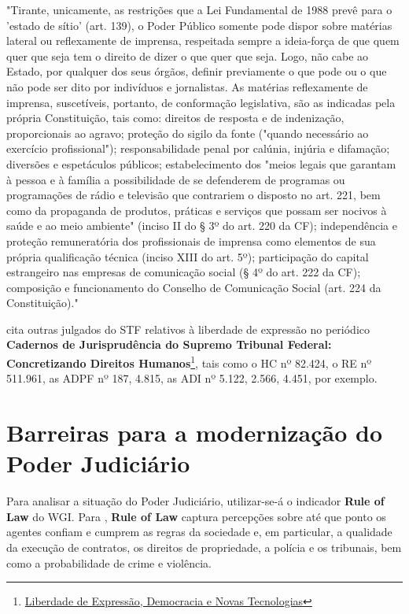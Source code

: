 \noindent
\begin{flushleft}
\setlength{\leftskip}{4cm}
\small
"Tirante, unicamente, as restrições que a Lei Fundamental de 1988 prevê para o 'estado de sítio' (art. 139), o Poder Público somente pode dispor sobre matérias lateral ou reflexamente de imprensa, respeitada sempre a ideia-força de que quem quer que seja tem o direito de dizer o que quer que seja. Logo, não cabe ao Estado, por qualquer dos seus órgãos, definir previamente o que pode ou o que não pode ser dito por indivíduos e jornalistas. As matérias reflexamente de imprensa, suscetíveis, portanto, de conformação legislativa, são as indicadas pela própria Constituição, tais como: direitos de resposta e de indenização, proporcionais ao agravo; proteção do sigilo da fonte ("quando necessário ao exercício profissional"); responsabilidade penal por calúnia, injúria e difamação; diversões e espetáculos
públicos; estabelecimento dos "meios legais que garantam à pessoa e à família a possibilidade de se defenderem de programas ou programações de rádio e televisão que contrariem o disposto no art. 221, bem como da propaganda de produtos, práticas e serviços que possam ser nocivos à saúde e ao meio ambiente" (inciso II do § 3º
do art. 220 da CF); independência e proteção remuneratória dos profissionais de imprensa como elementos de sua própria qualificação técnica (inciso XIII do art. 5º); participação do capital estrangeiro nas empresas de comunicação social (§ 4º do
art. 222 da CF); composição e funcionamento do Conselho de Comunicação Social (art. 224 da Constituição)." \cite{ado26}
\end{flushleft}

\cite{stf_caderno_liberdadeexpressao} cita outras julgados do STF relativos à liberdade de expressão no periódico \textbf{Cadernos de Jurisprudência do Supremo Tribunal Federal: Concretizando Direitos Humanos}\footnote{\href{https://www.cnj.jus.br/wp-content/uploads/2024/12/cadernos-stf-liberdadeexpressaoenovastecnologias.pdf}{Liberdade de Expressão, Democracia e Novas Tecnologias}}, tais como o HC nº 82.424, o RE nº 511.961, as ADPF nº 187, 4.815, as ADI nº 5.122, 2.566, 4.451, por exemplo.

\section{Barreiras para a modernização do Poder Judiciário}

Para analisar a situação do Poder Judiciário, utilizar-se-á o indicador \textbf{Rule of Law} do WGI. Para \cite{wgi_dados}, \textbf{Rule of Law} captura percepções sobre até que ponto os agentes confiam e cumprem as regras da sociedade e, em particular, a qualidade da execução de contratos, os direitos de propriedade, a polícia e os tribunais, bem como a probabilidade de crime e violência.

